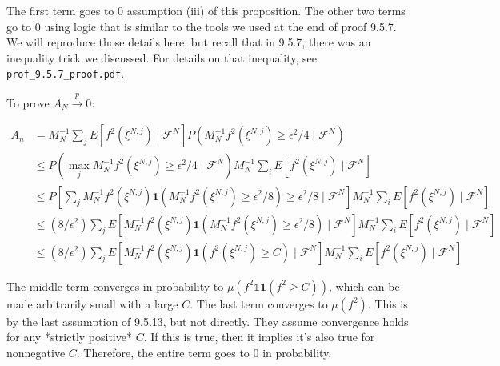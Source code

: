 \documentclass{article}
\begin{document}
The first term goes to $0$ assumption (iii) of this proposition. The other two terms go to $0$ using logic that is similar to the tools we used at the end of proof 9.5.7. We will reproduce those details here, but recall that in 9.5.7, there was an inequality trick we discussed. For details on that inequality, see \verb|prof_9.5.7_proof.pdf|.

To prove $A_N \overset{p}{\to} 0$: 

\begin{align*}
A_n &= M_N^{-1} \sum_j E[f^2(\xi^{N,j}) \mid \mathcal{F}^N]  P \left( M_N^{-1}f^2(\xi^{N,j}) \ge \epsilon^2/4  \mid \mathcal{F}^N  \right) \\
&\le P(\max_j M_N^{-1}f^2(\xi^{N,j}) \ge \epsilon^2/4 \mid \mathcal{F}^N ) M_N^{-1} \sum_i E[f^2(\xi^{N,j}) \mid \mathcal{F}^N] \\
&\le P\left[\sum_j M_N^{-1}f^2(\xi^{N,j}) \mathbf{1}\left(M_N^{-1}f^2(\xi^{N,j}) \ge \epsilon^2/8 \right) \ge \epsilon^2/8 \mid \mathcal{F}^N \right] M_N^{-1} \sum_i E[f^2(\xi^{N,j}) \mid \mathcal{F}^N]
\tag{9.5.7's second trick} \\
&\le (8/ \epsilon^2) \sum_j E\left[ M_N^{-1}f^2(\xi^{N,j}) \mathbf{1}\left(M_N^{-1}f^2(\xi^{N,j}) \ge \epsilon^2/8 \right) \mid \mathcal{F}^N \right]  M_N^{-1} \sum_i E[f^2(\xi^{N,j}) \mid \mathcal{F}^N]   \tag{Markov's} \\
&\le (8/ \epsilon^2) \sum_j E\left[ M_N^{-1}f^2(\xi^{N,j}) \mathbf{1}\left(f^2(\xi^{N,j}) \ge C \right) \mid \mathcal{F}^N \right]  M_N^{-1} \sum_i E[f^2(\xi^{N,j}) \mid \mathcal{F}^N] \tag{if $M_N \epsilon^2/8 > C$ }
\end{align*}

The middle term converges in probability to $\mu(f^2 \mathbb{1}\mathbf{1}\left(f^2 \ge C \right))$, which can be made arbitrarily small with a large $C$. The last term converges to $\mu(f^2 )$. This is by the last assumption of 9.5.13, but not directly. They assume convergence holds for any *strictly positive* $C$. If this is true, then it implies it's also true for nonnegative $C$. Therefore, the entire term goes to $0$ in probability.
\end{document}
